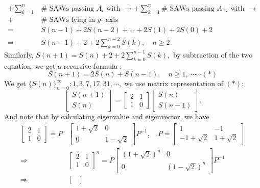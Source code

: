 \documentclass[12pt,a4paper]{report}
\theoremstyle{definition}
\begin{document}
\begin{enumerate}
\begin{enumerate}
\begin{align*}
	    	+\sum_{k=1}^n &\#\mbox{ SAWs passing } A_i\mbox{ with } \rightarrow + \sum_{k=1}^n \#\mbox{ SAWs passing } A_{-i}\mbox{ with } \rightarrow\\
	    	+&\#\mbox{ SAWs lying in } y\mbox{- axis}\\
	    	=& S(n-1)+2S(n-2)+\cdots +2S(1)+2S(0)+2\\
	    	=&S(n-1)+2+2\sum_{k=0}^{n-2}S(k),\quad n\geq 2
	    \end{align*}
	    Similarly, $S(n+1)=S(n)+2+2\sum\limits_{k=0}^{n-1}S(k),$ by subtraction of the two equation, we get a recursive formula :
	    \[
	    S(n+1)=2S(n)+S(n-1),\quad n\geq 1,\ \cdots\cdots(*)
	    \]
	    We get $\{S(n)\}_{n=0}^\infty:1,3,7,17,31,\cdots,$ we use matrix representation of $(*):$
	    \[
	    \begin{bmatrix}
	    S(n+1)\\
	    S(n)
	    \end{bmatrix}=\begin{bmatrix}
	    2 & 1\\
	    1 & 0
	    \end{bmatrix}\begin{bmatrix}
	    S(n)\\
	    S(n-1)
	    \end{bmatrix}.
	    \]
	    And note that by calculating eigenvalue and eigenvector, we have 
	    \begin{align*}
	    \begin{bmatrix}
	    2 & 1\\
	    1 & 0
	    \end{bmatrix}=P&\begin{bmatrix}
	    1+\sqrt{2} & 0\\
	    0 & 1-\sqrt{2}
	    \end{bmatrix}P^{-1},\quad P=\begin{bmatrix}
	    1 & -1\\
	    -1+\sqrt{2} & 1+\sqrt{2}
	    \end{bmatrix}\\
	    \Rightarrow & \begin{bmatrix}
	    2 & 1\\
	    1 & 0
	    \end{bmatrix}^n=P\begin{bmatrix}
	    (1+\sqrt{2})^n & 0\\
	    0 & (1-\sqrt{2})^n
	    \end{bmatrix}P^{-1}\\
	    \Rightarrow &\begin{bmatrix}

\end{bmatrix}
\end{align*}
\end{enumerate}
\end{enumerate}
\end{document}
